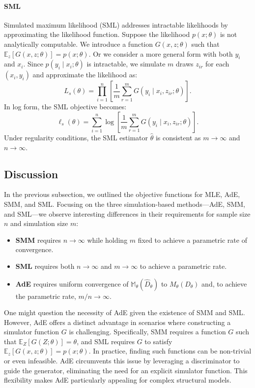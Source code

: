 \documentclass[12pt]{article}
\begin{document}
\paragraph{SML}
Simulated maximum likelihood (SML) addresses intractable likelihoods by
approximating the likelihood function. Suppose the likelihood \(p(x; \theta)\)
is not analytically computable. We introduce a function \(G(x, z; \theta)\)
such that \(\mathbb{E}_z[G(x, z; \theta)] = p(x; \theta)\). Or we consider a
more general form with both $y_i$ and $x_i$. Since \(p(y_i \mid x_i; \theta)\)
is intractable, we simulate \(m\) draws \(z_{ir}\) for each \((x_i, y_i)\) and
approximate the likelihood as:
\begin{equation*}
    L_s(\theta) = \prod_{i=1}^n \left[\frac{1}{m} \sum_{r=1}^m G(y_i \mid x_i, z_{ir}; \theta)\right].
\end{equation*}
In log form, the SML objective becomes:
\begin{equation*}
    \ell_s(\theta) = \sum_{i=1}^n \log \left[\frac{1}{m} \sum_{r=1}^m G(y_i \mid x_i, z_{ir}; \theta)\right].
\end{equation*}
Under regularity conditions, the SML estimator \(\hat{\theta}\) is consistent as \(m \to \infty\) and \(n \to \infty\).

\subsection{Discussion} \label{subsec:discussion}

In the previous subsection, we outlined the objective functions for MLE, AdE,
SMM, and SML. Focusing on the three simulation-based methods—AdE, SMM, and
SML—we observe interesting differences in their requirements for sample size
\(n\) and simulation size \(m\):

\begin{itemize}
    \item \textbf{SMM} requires \(n \to \infty\) while holding \(m\) fixed to achieve a parametric rate of convergence.
    \item \textbf{SML} requires both \(n \to \infty\) and \(m \to \infty\) to achieve a parametric rate.
    \item \textbf{AdE} requires uniform convergence of \(\mathbb{M}_\theta(\hat{D}_\theta)\) to \(M_\theta(D_\theta)\) and, to achieve the parametric rate, \(m/n \to \infty\).
\end{itemize}

One might question the necessity of AdE given the existence of SMM and SML.
However, AdE offers a distinct advantage in scenarios where constructing a
simulator function \(G\) is challenging. Specifically, SMM requires a function
\(G\) such that \(\mathbb{E}_Z[G(Z; \theta)] = \theta\), and SML requires \(G\)
to satisfy \(\mathbb{E}_z[G(x, z; \theta)] = p(x; \theta)\). In practice,
finding such functions can be non-trivial or even infeasible. AdE circumvents
this issue by leveraging a discriminator to guide the generator, eliminating
the need for an explicit simulator function. This flexibility makes AdE
particularly appealing for complex structural models.
\end{document}
